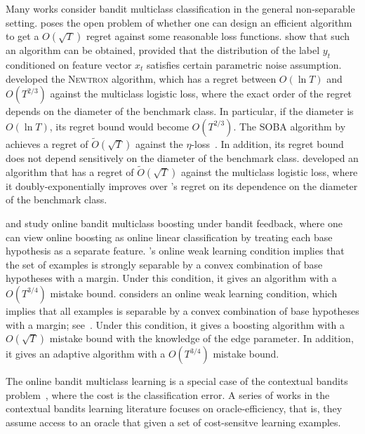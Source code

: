 Many works consider bandit multiclass classification in the general
non-separable setting. \citet{Abernethy-Rakhlin-2009} poses the open problem of
whether one can design an efficient algorithm to get a $O(\sqrt{T})$ regret
against some reasonable loss functions. \citet{Crammer-Gentile-2013} show that
such an algorithm can be obtained, provided that the distribution of the label
$y_t$ conditioned on feature vector $x_t$ satisfies certain parametric noise
assumption. \citet{Hazan-Kale-2011} developed the \textsc{Newtron} algorithm,
which has a regret between $O(\ln T)$ and $O(T^{2/3})$ against the multiclass
logistic loss, where the exact order of the regret depends on the diameter of
the benchmark class. In particular, if the diameter is $O(\ln T)$, its regret
bound would become $O(T^{2/3})$. The \textsc{SOBA} algorithm by
\citet{Beygelzimer-Orabona-Zhang-2017} achieves a regret of
$\widetilde{O}(\sqrt{T})$ against the
$\eta$-loss~\citet{Orabona-Cesa-Bianchi-Gentile-2012}. In addition, its regret
bound does not depend sensitively on the diameter of the benchmark class.
\citet{Foster-Kale-Luo-Mohri-Sridharan-2018} developed an algorithm that has a
regret of $\widetilde{O}(\sqrt{T})$ against the multiclass logistic loss, where
it doubly-exponentially improves over \citet{Hazan-Kale-2011}'s regret on its
dependence on the diameter of the benchmark class.

\citet{Chen-Lin-Lu-2014} and \citet{Zhang-Jung-Tewari-2018} study online bandit
multiclass boosting under bandit feedback, where one can view online boosting as
online linear classification by treating each base hypothesis as a separate
feature. \citet{Chen-Lin-Lu-2014}'s online weak learning condition implies that
the set of examples is strongly separable by a convex combination of base
hypotheses with a margin. Under this condition, it gives an algorithm with a
$O(T^{3/4})$ mistake bound. \citet{Zhang-Jung-Tewari-2018} considers an online
weak learning condition, which implies that all examples is separable by a
convex combination of base hypotheses with a margin; see~\citet[Theorem
3]{Mukherjee-Schapire-2013}. Under this condition, it gives a boosting algorithm
with a $O(\sqrt{T})$ mistake bound with the knowledge of the edge parameter. In
addition, it gives an adaptive algorithm with a $O(T^{3/4})$ mistake bound.

The online bandit multiclass learning is a special case of the contextual
bandits problem~\citep{Auer-2003, Langford-Zhang-2008}, where the cost is the
classification error. A series of works in the contextual bandits learning
literature focuses on oracle-efficiency, that is, they assume access to an
oracle that given a set of cost-sensitve learning examples.

